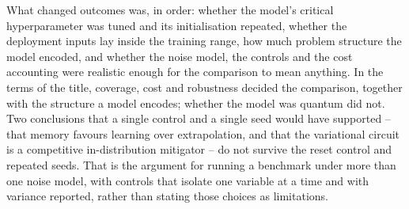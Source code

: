 \documentclass[Thesis.tex]{subfiles}
\begin{document}
What changed outcomes was, in order: whether the model's critical hyperparameter was
tuned and its initialisation repeated, whether the deployment inputs lay inside the
training range, how much problem structure the model encoded, and whether the noise
model, the controls and the cost accounting were realistic enough for the comparison
to mean anything. In the terms of the title, coverage, cost and robustness decided
the comparison, together with the structure a model encodes; whether the model was
quantum did not. Two conclusions that a single control and a single seed would
have supported -- that memory favours learning over extrapolation, and that the
variational circuit is a competitive in-distribution mitigator -- do not survive the
reset control and repeated seeds.
That is the argument for running a benchmark under more than one noise model, with
controls that isolate one variable at a time and with variance reported, rather than
stating those choices as limitations.
\end{document}
